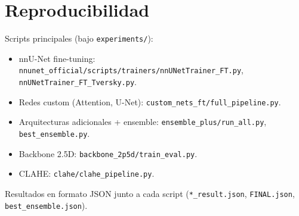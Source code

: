 \documentclass[11pt]{article}
\begin{document}
\appendix
\section{Reproducibilidad}
Scripts principales (bajo \texttt{experiments/}):
\begin{itemize}\itemsep1pt
  \item nnU-Net fine-tuning: \texttt{nnunet\_official/scripts/trainers/nnUNetTrainer\_FT.py},
        \texttt{nnUNetTrainer\_FT\_Tversky.py}.
  \item Redes custom (Attention, U-Net): \texttt{custom\_nets\_ft/full\_pipeline.py}.
  \item Arquitecturas adicionales + ensemble: \texttt{ensemble\_plus/run\_all.py},
        \texttt{best\_ensemble.py}.
  \item Backbone 2.5D: \texttt{backbone\_2p5d/train\_eval.py}.
  \item CLAHE: \texttt{clahe/clahe\_pipeline.py}.
\end{itemize}
Resultados en formato JSON junto a cada script (\texttt{*\_result.json}, \texttt{FINAL.json},
\texttt{best\_ensemble.json}).
\end{document}

